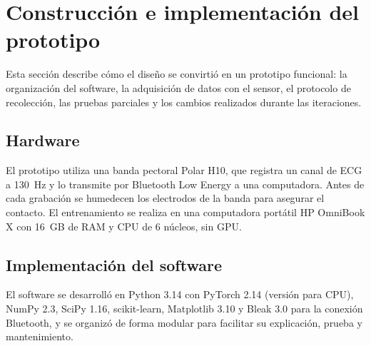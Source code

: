\section{Construcción e implementación del prototipo}
\label{sec:construccion}

Esta sección describe cómo el diseño se convirtió en un prototipo funcional: la organización del software, la adquisición de datos con el sensor, el protocolo de recolección, las pruebas parciales y los cambios realizados durante las iteraciones.

\subsection{Hardware}

El prototipo utiliza una banda pectoral Polar H10, que registra un canal de ECG a 130~Hz y lo transmite por Bluetooth Low Energy a una computadora. Antes de cada grabación se humedecen los electrodos de la banda para asegurar el contacto. El entrenamiento se realiza en una computadora portátil HP OmniBook X con 16~GB de RAM y CPU de 6 núcleos, sin GPU. 

\subsection{Implementación del software}

El software se desarrolló en Python 3.14 con PyTorch 2.14 (versión para CPU), NumPy 2.3, SciPy 1.16, scikit-learn, Matplotlib 3.10 y Bleak 3.0 para la conexión Bluetooth, y se organizó de forma modular para facilitar su explicación, prueba y mantenimiento.

